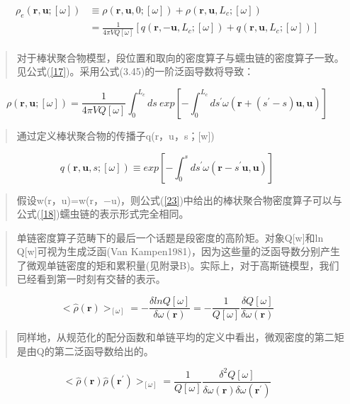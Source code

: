 \begin{align}\label{22}
\begin{split}
\rho_e(\mathbf{r},\mathbf{u};[\omega])&\equiv\rho(\mathbf{r},\mathbf{u},0;[\omega])+\rho(\mathbf{r},\mathbf{u},L_c;[\omega])\\ &=\frac{1}{4\pi VQ[\omega]}[q(\mathbf{r},-\mathbf{u},L_c;[\omega])+q(\mathbf{r},\mathbf{u},L_c;[\omega])]
\end{split}
\end{align}
\begin{quotation}
对于棒状聚合物模型，段位置和取向的密度算子与蠕虫链的密度算子一致。见公式(\ref{17})。采用公式(3.45)的一阶泛函导数将导致：
\end{quotation}
\begin{equation}\label{23}
\rho(\mathbf{r},\mathbf{u};[\omega])=\frac{1}{4\pi VQ[\omega]}\int_{0}^{L_c}ds~exp[-\int_{0}^{L_c}ds^{'}\omega (\mathbf{r}+(s^{'}-s)\mathbf{u},\mathbf{u})]
\end{equation}
\begin{quotation}
通过定义棒状聚合物的传播子q(r，u，s；[w])
\end{quotation}
\begin{equation}\label{24}
q(\mathbf{r},\mathbf{u},s;[\omega])\equiv exp[-\int_{0}^{s}ds^{'}\omega(\mathbf{r}-s^{'}\mathbf{u},\mathbf{u})]
\end{equation}
\begin{quotation}
假设w(r，u)=w(r，−u)，则公式(\ref{23})中给出的棒状聚合物密度算子可以与公式(\ref{18})蠕虫链的表示形式完全相同。
\end{quotation}
\begin{quotation}
单链密度算子范畴下的最后一个话题是段密度的高阶矩。对象Q[w]和ln Q[w]可视为生成泛函(Van Kampen1981)，因为这些量的泛函导数分别产生了微观单链密度的矩和累积量(见附录B)。实际上，对于高斯链模型，我们已经看到第一时刻有交替的表示。
\end{quotation}
\begin{equation}\label{25}
<\hat{\rho}(\mathbf{r})>_{[\omega]}=-\frac{\delta lnQ[\omega]}{\delta \omega(\mathbf{r})}=-\frac{1}{Q[\omega]}\frac{\delta Q[\omega]}{\delta\omega(\mathbf{r})}
\end{equation}
\begin{quotation}
同样地，从规范化的配分函数和单链平均的定义中看出，微观密度的第二矩是由Q的第二泛函导数给出的。
\end{quotation}
\begin{equation}\label{26}
<\hat{\rho}(\mathbf{r})\hat{\rho}(\mathbf{r}^{'})>_{[\omega]}=\frac{1}{Q[\omega]}\frac{\delta^2 Q[\omega]}{\delta\omega(\mathbf{r})\delta \omega(\mathbf{r}^{'})}
\end{equation}
